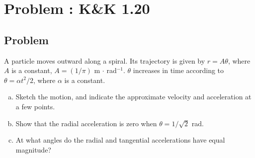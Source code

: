\documentclass[solutions]{esg8012pset}
\begin{document}
\section{Problem \thesection: K\&K 1.20}
\subsection{Problem}
  A particle moves outward along a spiral. Its trajectory is given by
  $r = A\theta$, where $A$ is a constant, $A = (1/\pi )$ m $\cdot$ rad$^{-1}$.  $\theta$ increases in time according to $\theta =\alpha t^2 / 2$, where $\alpha$ is a constant.
  \begin{enumerate}[a.]
    \item Sketch the motion, and indicate the approximate velocity and acceleration at a few
  points.
    \item Show that the radial acceleration is zero when $\theta =1/\sqrt{2}$ rad.
    \item At what angles do the radial and tangential accelerations have equal magnitude?
  \end{enumerate}
\end{document}
